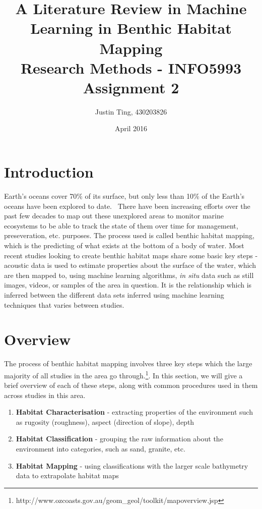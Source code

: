 \documentclass[12pt]{article}
\title{A Literature Review in Machine Learning in Benthic Habitat Mapping \\ Research Methods - INFO5993 Assignment 2}
\author{Justin Ting, 430203826}
\date{April 2016}
\begin{document}
\maketitle

           \section{Introduction}

            Earth's oceans cover 70\% of its surface, but only less than 10\% of the Earth's oceans have been explored to date.~\citep*{NOAA} There have been increasing efforts over the past few decades to map out these unexplored areas to monitor marine ecosystems to be able to track the state of them over time for management, preseveration, etc. purposes. The process used is called benthic habitat mapping, which is the predicting of what exists at the bottom of a body of water. Most recent studies looking to create benthic habitat maps share some basic key steps - acoustic data is used to estimate properties about the surface of the water, which are then mapped to, using machine learning algorithms, \textit{in situ} data such as still images, videos, or samples of the area in question. It is the relationship which is inferred between the different data sets inferred using machine learning techniques that varies between studies.

           \section{Overview}
            The process of benthic habitat mapping involves three key steps which the large majority of all studies in the area go through.\footnote{http://www.ozcoasts.gov.au/geom\_geol/toolkit/mapoverview.jsp}. In this section, we will give a brief overview of each of these steps, along with common procedures used in them across studies in this area.

            \begin{enumerate}
                \item \textbf{Habitat Characterisation} - extracting properties of the environment such as rugosity (roughness), aspect (direction of slope), depth
                \item \textbf{Habitat Classification} - grouping the raw information about the environment into categories, such as sand, granite, etc.
                \item \textbf{Habitat Mapping} - using classifications with the larger scale bathymetry data to extrapolate habitat maps 
            \end{enumerate}
\end{document}
